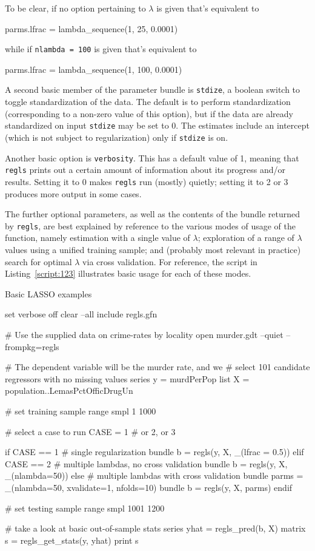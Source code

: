\documentclass{article}
\begin{document}
To be clear, if no option pertaining to $\lambda$ is given that's
equivalent to
\begin{code}
parms.lfrac = lambda_sequence(1, 25, 0.0001)
\end{code}
while if \texttt{nlambda = 100} is given that's equivalent to
\begin{code}
parms.lfrac = lambda_sequence(1, 100, 0.0001)
\end{code}

A second basic member of the parameter bundle is \texttt{stdize}, a
boolean switch to toggle standardization of the data. The default is
to perform standardization (corresponding to a non-zero value of this
option), but if the data are already standardized on input
\texttt{stdize} may be set to 0.  The estimates include an intercept
(which is not subject to regularization) only if \texttt{stdize} is
on.

Another basic option is \texttt{verbosity}. This has a default value
of 1, meaning that \texttt{regls} prints out a certain amount of
information about its progress and/or results. Setting it to 0 makes
\texttt{regls} run (mostly) quietly; setting it to 2 or 3 produces
more output in some cases.

The further optional parameters, as well as the contents of the bundle
returned by \texttt{regls}, are best explained by reference to the
various modes of usage of the function, namely estimation with a
single value of $\lambda$; exploration of a range of $\lambda$ values
using a unified training sample; and (probably most relevant in
practice) search for optimal $\lambda$ via cross validation. For
reference, the script in Listing~\ref{script:123} illustrates
basic usage for each of these modes.

\begin{script}[htbp]
  \caption{Basic LASSO examples}
  \label{script:123}
\begin{scode}
set verbose off
clear --all
include regls.gfn

# Use the supplied data on crime-rates by locality
open murder.gdt --quiet --frompkg=regls

# The dependent variable will be the murder rate, and we
# select 101 candidate regressors with no missing values
series y = murdPerPop
list X = population..LemasPctOfficDrugUn

# set training sample range
smpl 1 1000

# select a case to run
CASE = 1 # or 2, or 3

if CASE == 1
   # single regularization
   bundle b = regls(y, X, _(lfrac = 0.5))
elif CASE == 2
   # multiple lambdas, no cross validation
   bundle b = regls(y, X, _(nlambda=50))
else
   # multiple lambdas with cross validation
   bundle parms = _(nlambda=50, xvalidate=1, nfolds=10)
   bundle b = regls(y, X, parms)
endif

# set testing sample range
smpl 1001 1200

# take a look at basic out-of-sample stats
series yhat = regls_pred(b, X)
matrix s = regls_get_stats(y, yhat)
print s
\end{scode}
\end{script}
\end{document}
